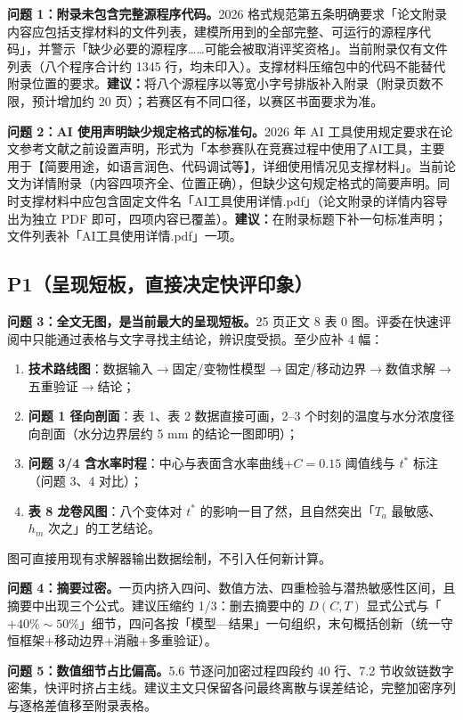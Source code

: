 \documentclass[12pt,a4paper]{ctexart}
\begin{document}
\textbf{问题 1：附录未包含完整源程序代码。}2026 格式规范第五条明确要求「论文附录内容应包括支撑材料的文件列表，建模所用到的全部完整、可运行的源程序代码」，并警示「缺少必要的源程序……可能会被取消评奖资格」。当前附录仅有文件列表（八个程序合计约 1345 行，均未印入）。支撑材料压缩包中的代码不能替代附录位置的要求。\textbf{建议：}将八个源程序以等宽小字号排版补入附录（附录页数不限，预计增加约 20 页）；若赛区有不同口径，以赛区书面要求为准。

\textbf{问题 2：AI 使用声明缺少规定格式的标准句。}2026 年 AI 工具使用规定要求在论文参考文献之前设置声明，形式为「本参赛队在竞赛过程中使用了AI工具，主要用于【简要用途，如语言润色、代码调试等】，详细使用情况见支撑材料」。当前论文为详情附录（内容四项齐全、位置正确），但缺少这句规定格式的简要声明。同时支撑材料中应包含固定文件名「AI工具使用详情.pdf」（论文附录的详情内容导出为独立 PDF 即可，四项内容已覆盖）。\textbf{建议：}在附录标题下补一句标准声明；文件列表补「AI工具使用详情.pdf」一项。

\subsection{P1（呈现短板，直接决定快评印象）}

\textbf{问题 3：全文无图，是当前最大的呈现短板。}25 页正文 8 表 0 图。评委在快速评阅中只能通过表格与文字寻找主结论，辨识度受损。至少应补 4 幅：
\begin{enumerate}[label=(\alph*),leftmargin=2em]
\item \textbf{技术路线图}：数据输入$\to$固定/变物性模型$\to$固定/移动边界$\to$数值求解$\to$五重验证$\to$结论；
\item \textbf{问题 1 径向剖面}：表 1、表 2 数据直接可画，2--3 个时刻的温度与水分浓度径向剖面（水分边界层约 5 mm 的结论一图即明）；
\item \textbf{问题 3/4 含水率时程}：中心与表面含水率曲线+$C=0.15$ 阈值线与 $t^*$ 标注（问题 3、4 对比）；
\item \textbf{表 8 龙卷风图}：八个变体对 $t^*$ 的影响一目了然，且自然突出「$T_a$ 最敏感、$h_m$ 次之」的工艺结论。
\end{enumerate}
图可直接用现有求解器输出数据绘制，不引入任何新计算。

\textbf{问题 4：摘要过密。}一页内挤入四问、数值方法、四重检验与潜热敏感性区间，且摘要中出现三个公式。建议压缩约 1/3：删去摘要中的 $D(C,T)$ 显式公式与「$+40\%\sim50\%$」细节，四问各按「模型—结果」一句组织，末句概括创新（统一守恒框架+移动边界+消融+多重验证）。

\textbf{问题 5：数值细节占比偏高。}5.6 节逐问加密过程四段约 40 行、7.2 节收敛链数字密集，快评时挤占主线。建议主文只保留各问最终离散与误差结论，完整加密序列与逐格差值移至附录表格。
\end{document}

